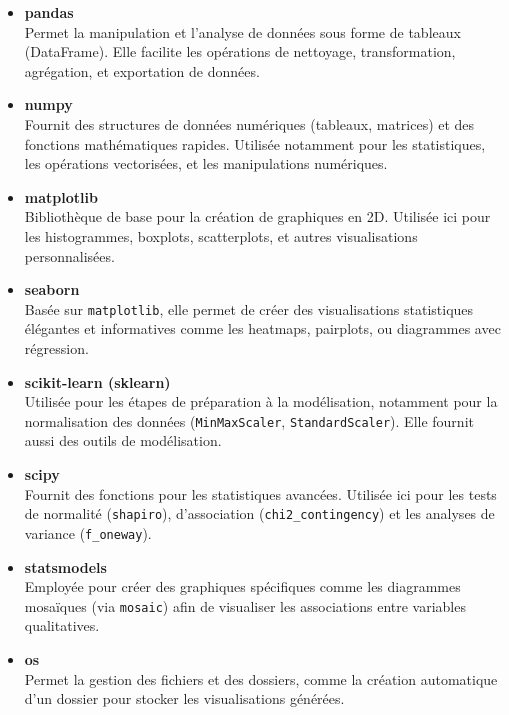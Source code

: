 \documentclass[12pt]{report}
\begin{document}
\begin{itemize}
    \item \textbf{pandas} \\
    Permet la manipulation et l'analyse de données sous forme de tableaux (DataFrame). Elle facilite les opérations de nettoyage, transformation, agrégation, et exportation de données.
    
    \item \textbf{numpy} \\
    Fournit des structures de données numériques (tableaux, matrices) et des fonctions mathématiques rapides. Utilisée notamment pour les statistiques, les opérations vectorisées, et les manipulations numériques.

    \item \textbf{matplotlib} \\
    Bibliothèque de base pour la création de graphiques en 2D. Utilisée ici pour les histogrammes, boxplots, scatterplots, et autres visualisations personnalisées.

    \item \textbf{seaborn} \\
    Basée sur \texttt{matplotlib}, elle permet de créer des visualisations statistiques élégantes et informatives comme les heatmaps, pairplots, ou diagrammes avec régression.

    \item \textbf{scikit-learn (sklearn)} \\
    Utilisée pour les étapes de préparation à la modélisation, notamment pour la normalisation des données (\texttt{MinMaxScaler}, \texttt{StandardScaler}). Elle fournit aussi des outils de modélisation.

    \item \textbf{scipy} \\
    Fournit des fonctions pour les statistiques avancées. Utilisée ici pour les tests de normalité (\texttt{shapiro}), d’association (\texttt{chi2\_contingency}) et les analyses de variance (\texttt{f\_oneway}).

    \item \textbf{statsmodels} \\
    Employée pour créer des graphiques spécifiques comme les diagrammes mosaïques (via \texttt{mosaic}) afin de visualiser les associations entre variables qualitatives.

    \item \textbf{os} \\
    Permet la gestion des fichiers et des dossiers, comme la création automatique d’un dossier pour stocker les visualisations générées.


\end{itemize}
\end{document}
